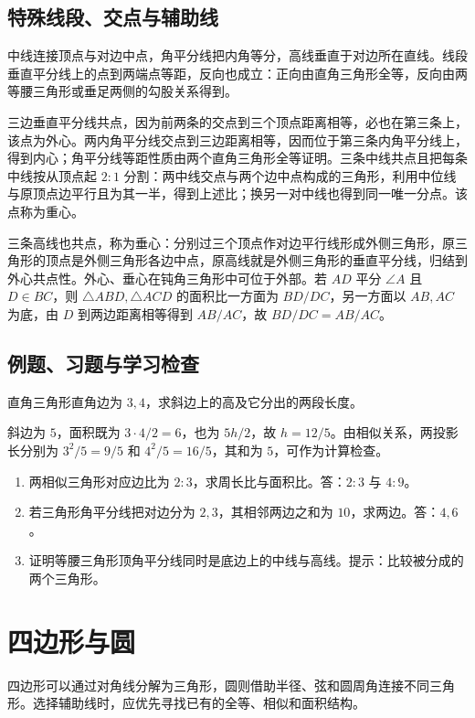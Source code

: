 \documentclass[UTF8]{ctexbook}
\begin{document}
\section{特殊线段、交点与辅助线}
中线连接顶点与对边中点，角平分线把内角等分，高线垂直于对边所在直线。线段垂直平分线上的点到两端点等距，反向也成立：正向由直角三角形全等，反向由两等腰三角形或垂足两侧的勾股关系得到。

三边垂直平分线共点，因为前两条的交点到三个顶点距离相等，必也在第三条上，该点为外心。两内角平分线交点到三边距离相等，因而位于第三条内角平分线上，得到内心；角平分线等距性质由两个直角三角形全等证明。三条中线共点且把每条中线按从顶点起 $2:1$ 分割：两中线交点与两个边中点构成的三角形，利用中位线与原顶点边平行且为其一半，得到上述比；换另一对中线也得到同一唯一分点。该点称为重心。

三条高线也共点，称为垂心：分别过三个顶点作对边平行线形成外侧三角形，原三角形的顶点是外侧三角形各边中点，原高线就是外侧三角形的垂直平分线，归结到外心共点性。外心、垂心在钝角三角形中可位于外部。若 $AD$ 平分 $\angle A$ 且 $D\in BC$，则 $\triangle ABD,\triangle ACD$ 的面积比一方面为 $BD/DC$，另一方面以 $AB,AC$ 为底，由 $D$ 到两边距离相等得到 $AB/AC$，故 $BD/DC=AB/AC$。

\section{例题、习题与学习检查}
\begin{example}
直角三角形直角边为 $3,4$，求斜边上的高及它分出的两段长度。
\end{example}
\begin{solve}
斜边为 $5$，面积既为 $3\cdot4/2=6$，也为 $5h/2$，故 $h=12/5$。由相似关系，两投影长分别为 $3^2/5=9/5$ 和 $4^2/5=16/5$，其和为 $5$，可作为计算检查。
\end{solve}
\begin{enumerate}
\item 两相似三角形对应边比为 $2:3$，求周长比与面积比。答：$2:3$ 与 $4:9$。
\item 若三角形角平分线把对边分为 $2,3$，其相邻两边之和为 $10$，求两边。答：$4,6$。
\item 证明等腰三角形顶角平分线同时是底边上的中线与高线。提示：比较被分成的两个三角形。
\end{enumerate}

\chapter{四边形与圆}
\label{chap:em-circles}
四边形可以通过对角线分解为三角形，圆则借助半径、弦和圆周角连接不同三角形。选择辅助线时，应优先寻找已有的全等、相似和面积结构。
\end{document}
